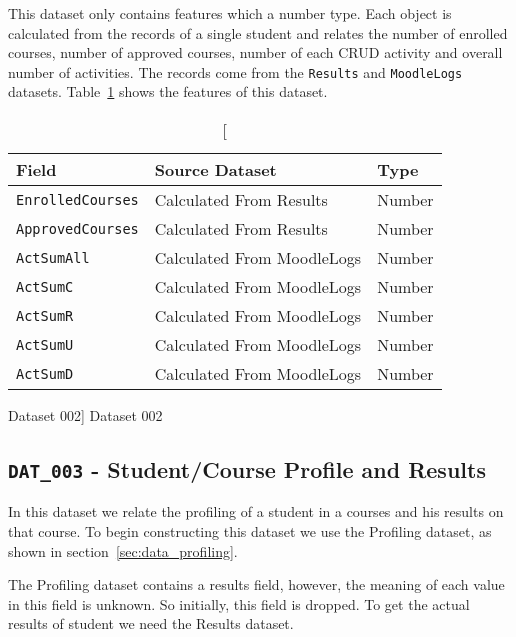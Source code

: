 This dataset only contains features which a number type. Each object is
calculated from the records of a single student and relates the number of
enrolled courses, number of approved courses, number of each CRUD activity and
overall number of activities. The records come from the \texttt{Results} and
\texttt{MoodleLogs} datasets. Table~\ref{tab:dat_002} shows the features of
this dataset.

\begin{table}[h!]
    \centering

    \begin{tabular}{| l | l | l |}
        \hline
        \textbf{Field}           & \textbf{Source Dataset}    & \textbf{Type} \\ \hline
        \texttt{EnrolledCourses} & Calculated From Results    & Number        \\ \hline
        \texttt{ApprovedCourses} & Calculated From Results    & Number        \\ \hline
        \texttt{ActSumAll}       & Calculated From MoodleLogs & Number        \\ \hline
        \texttt{ActSumC}         & Calculated From MoodleLogs & Number        \\ \hline
        \texttt{ActSumR}         & Calculated From MoodleLogs & Number        \\ \hline
        \texttt{ActSumU}         & Calculated From MoodleLogs & Number        \\ \hline
        \texttt{ActSumD}         & Calculated From MoodleLogs & Number        \\ \hline
    \end{tabular}

    \caption
        [Dataset 002]
        {Dataset 002}

    \label{tab:dat_002}
\end{table}

\subsection{\texttt{DAT\_003} - Student/Course Profile and Results}
\label{sec:dat_003}

In this dataset we relate the profiling of a student in a courses and his
results on that course. To begin constructing this dataset we use the Profiling
dataset, as shown in section~\ref{sec:data_profiling}.

The Profiling dataset contains a results field, however, the meaning of each
value in this field is unknown. So initially, this field is dropped. To get the
actual results of student we need the Results dataset.

